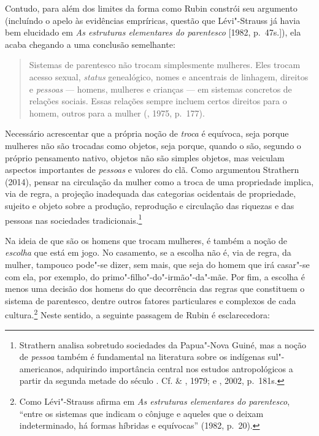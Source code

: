 Contudo, para além dos limites da forma como Rubin constrói seu
argumento (incluíndo o apelo às evidências empríricas, questão que
Lévi"-Strauss já havia bem elucidado em \emph{As estruturas elementares
do parentesco} {[}1982, p.~47s.{]}), ela acaba chegando
a uma conclusão semelhante:

\begin{quote}
Sistemas de parentesco não trocam simplesmente mulheres. Eles trocam
acesso sexual, \emph{status} genealógico, nomes e ancentrais de
linhagem, direitos e \emph{pessoas} --- homens, mulheres e crianças ---
em sistemas concretos de relações sociais. Essas relações sempre incluem
certos direitos para o homem, outros para a mulher (,
  1975, p.~177).
\end{quote}

Necessário acrescentar que a própria noção de \emph{troca} é equívoca,
seja porque mulheres não são trocadas como objetos, seja porque, quando
o são, segundo o próprio pensamento nativo, objetos não são simples
objetos, mas veiculam aspectos importantes de \emph{pessoas} e valores
do clã. Como argumentou Strathern (2014), pensar na
circulação da mulher como a troca de uma propriedade implica, via de
regra, a projeção inadequada das categorias ocidentais de propriedade,
sujeito e objeto sobre a produção, reprodução e circulação das riquezas
e das pessoas nas sociedades tradicionais.\footnote{Strathern analisa
  sobretudo sociedades da Papua"-Nova Guiné, mas a noção de \emph{pessoa}
  também é fundamental na literatura sobre os indígenas sul"-americanos,
  adquirindo importância central nos estudos antropológicos a partir da
  segunda metade do século . Cf.  \& , 1979; e , 2002, p.~181s.}

Na ideia de que são os homens que trocam mulheres, é também a noção de
\emph{escolha} que está em jogo. No casamento, se a escolha não é, via
de regra, da mulher, tampouco pode"-se dizer, sem mais, que seja do homem
que irá casar"-se com ela, por exemplo, do primo"-filho"-do"-irmão"-da"-mãe.
Por fim, a escolha é menos uma decisão dos homens do que decorrência das
regras que constituem o sistema de parentesco, dentre outros fatores
particulares e complexos de cada cultura.\footnote{Como Lévi"-Strauss
  afirma em \emph{As estruturas elementares do parentesco}, ``entre os
  sistemas que indicam o cônjuge e aqueles que o deixam
  indeterminado, há formas híbridas e equívocas'' (1982,
    p.~20).} Neste sentido, a seguinte passagem de Rubin é esclarecedora:


